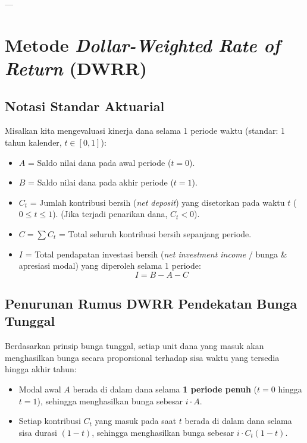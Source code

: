 \documentclass[11pt,a4paper]{article}
\begin{document}
---

\section{Metode \textit{Dollar-Weighted Rate of Return} (DWRR)}

\subsection{Notasi Standar Aktuarial}
Misalkan kita mengevaluasi kinerja dana selama 1 periode waktu (standar: 1 tahun kalender, $t \in [0, 1]$):
\begin{itemize}[leftmargin=1.5em]
    \item $A$ = Saldo nilai dana pada awal periode ($t = 0$).
    \item $B$ = Saldo nilai dana pada akhir periode ($t = 1$).
    \item $C_t$ = Jumlah kontribusi bersih (\textit{net deposit}) yang disetorkan pada waktu $t$ ($0 \le t \le 1$). (Jika terjadi penarikan dana, $C_t < 0$).
    \item $C = \sum C_t$ = Total seluruh kontribusi bersih sepanjang periode.
    \item $I$ = Total pendapatan investasi bersih (\textit{net investment income} / bunga \& apresiasi modal) yang diperoleh selama 1 periode:
    \begin{equation}
        I = B - A - C
    \end{equation}
\end{itemize}

\subsection{Penurunan Rumus DWRR Pendekatan Bunga Tunggal}

Berdasarkan prinsip bunga tunggal, setiap unit dana yang masuk akan menghasilkan bunga secara proporsional terhadap sisa waktu yang tersedia hingga akhir tahun:
\begin{itemize}
    \item Modal awal $A$ berada di dalam dana selama \textbf{1 periode penuh} ($t=0$ hingga $t=1$), sehingga menghasilkan bunga sebesar $i \cdot A$.
    \item Setiap kontribusi $C_t$ yang masuk pada saat $t$ berada di dalam dana selama sisa durasi $(1 - t)$, sehingga menghasilkan bunga sebesar $i \cdot C_t (1 - t)$.
\end{itemize}
\end{document}

